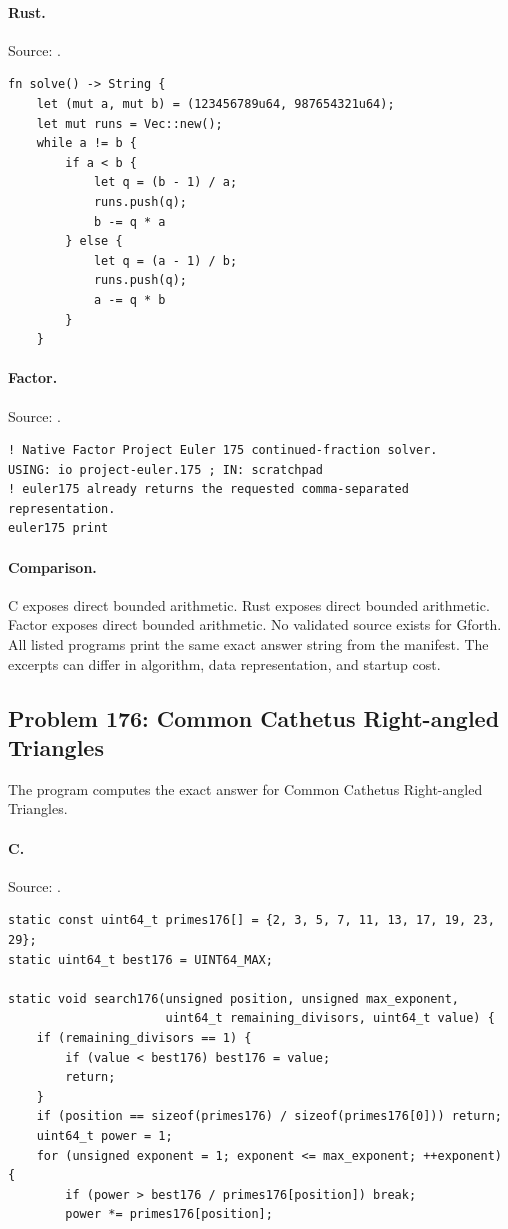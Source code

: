 \paragraph{Rust.} Source: .
\begin{lstlisting}
fn solve() -> String {
    let (mut a, mut b) = (123456789u64, 987654321u64);
    let mut runs = Vec::new();
    while a != b {
        if a < b {
            let q = (b - 1) / a;
            runs.push(q);
            b -= q * a
        } else {
            let q = (a - 1) / b;
            runs.push(q);
            a -= q * b
        }
    }
\end{lstlisting}

\paragraph{Factor.} Source: .
\begin{lstlisting}
! Native Factor Project Euler 175 continued-fraction solver.
USING: io project-euler.175 ; IN: scratchpad
! euler175 already returns the requested comma-separated representation.
euler175 print
\end{lstlisting}

\paragraph{Comparison.}
C exposes direct bounded arithmetic. Rust exposes direct bounded arithmetic. Factor exposes direct bounded arithmetic.
No validated source exists for Gforth.
All listed programs print the same exact answer string from the manifest. The excerpts can differ in algorithm, data representation, and startup cost.

\subsection{Problem 176: Common Cathetus Right-angled Triangles}
\label{walkthrough:p176}
The program computes the exact answer for Common Cathetus Right-angled Triangles.

\paragraph{C.} Source: .
\begin{lstlisting}
static const uint64_t primes176[] = {2, 3, 5, 7, 11, 13, 17, 19, 23, 29};
static uint64_t best176 = UINT64_MAX;

static void search176(unsigned position, unsigned max_exponent,
                      uint64_t remaining_divisors, uint64_t value) {
    if (remaining_divisors == 1) {
        if (value < best176) best176 = value;
        return;
    }
    if (position == sizeof(primes176) / sizeof(primes176[0])) return;
    uint64_t power = 1;
    for (unsigned exponent = 1; exponent <= max_exponent; ++exponent) {
        if (power > best176 / primes176[position]) break;
        power *= primes176[position];
\end{lstlisting}


